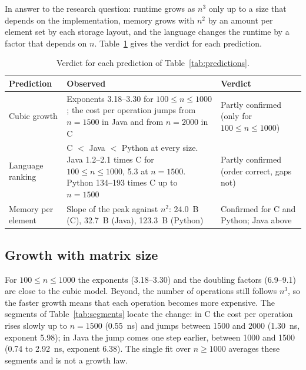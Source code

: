 \documentclass[12pt,a4paper]{article}
\begin{document}
In answer to the research question: runtime grows as $n^3$ only up to a size that depends
on the implementation, memory grows with $n^2$ by an amount per element set by each
storage layout, and the language changes the runtime by a factor that depends on $n$.
Table~\ref{tab:verdicts} gives the verdict for each prediction.

\begin{table}[H]
\centering
\small
\begin{tabular}{p{2.2cm}p{8.0cm}>{\raggedright\arraybackslash}p{3.0cm}}
\toprule
\textbf{Prediction} & \textbf{Observed} & \textbf{Verdict} \\
\midrule
Cubic growth & Exponents 3.18--3.30 for $100 \le n \le 1000$; the cost per operation
jumps from $n = 1500$ in Java and from $n = 2000$ in C & Partly confirmed (only for
$100 \le n \le 1000$) \\
\addlinespace
Language ranking & C $<$ Java $<$ Python at every size. Java 1.2--2.1 times C for
$100 \le n \le 1000$, 5.3 at $n = 1500$. Python 134--193 times C up to $n = 1500$ &
Partly confirmed (order correct, gaps not) \\
\addlinespace
Memory per element & Slope of the peak against $n^2$: 24.0~B (C), 32.7~B (Java),
123.3~B (Python) & Confirmed for C and Python; Java above \\
\bottomrule
\end{tabular}
\caption{Verdict for each prediction of Table~\ref{tab:predictions}.}
\label{tab:verdicts}
\end{table}

\subsection{Growth with matrix size}

For $100 \le n \le 1000$ the exponents (3.18--3.30) and the doubling factors (6.9--9.1)
are close to the cubic model. Beyond, the number of operations still follows $n^3$, so
the faster growth means that each operation becomes more expensive. The segments of
Table~\ref{tab:segments} locate the change: in C the cost per operation rises slowly up
to $n = 1500$ (0.55~ns) and jumps between 1500 and 2000 (1.30~ns, exponent 5.98); in Java
the jump comes one step earlier, between 1000 and 1500 (0.74 to 2.92~ns, exponent 6.38).
The single fit over $n \ge 1000$ averages these segments and is not a growth law.
\end{document}
